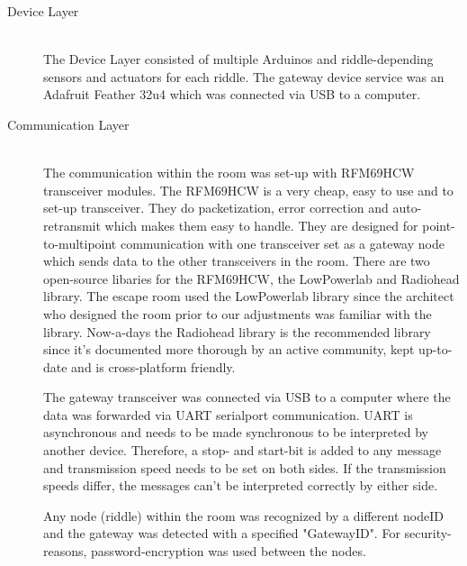 \begin{description}
	\item[Device Layer]\hfill \\
	      The Device Layer consisted of multiple Arduinos and riddle-depending sensors and actuators for each riddle.
	      The gateway device service was an Adafruit Feather 32u4 which was connected via USB to a computer.
	\item[Communication Layer]\hfill \\
	      The communication within the room was set-up with RFM69HCW transceiver modules.\parencite{radiorange}
          The RFM69HCW is a very cheap, easy to use and to set-up transceiver. They do packetization, error correction and auto-retransmit which makes them easy to handle.
	      They are designed for point-to-multipoint communication with one transceiver set as a gateway node which sends data to the other transceivers in the room.
	      There are two open-source libaries for the RFM69HCW, the LowPowerlab \parencite{LowPowerLab} and Radiohead \parencite{radiohead} library.
	      The escape room used the LowPowerlab library since the architect who designed the room prior to our adjustments was familiar with the library.
          Now-a-days the Radiohead library is the recommended library \parencite{adafruitRecommends} since it's documented more thorough by an active community, kept up-to-date and is cross-platform friendly.
         
          The gateway transceiver was connected via USB to a computer where the data was forwarded via UART serialport communication.
        UART is asynchronous and needs to be made synchronous to be interpreted by another device. 
          Therefore, a stop- and start-bit is added to any message and transmission speed needs to be set on both sides.
          If the transmission speeds differ, the messages can't be interpreted correctly by either side.
            
          Any node (riddle) within the room was recognized by a different nodeID and the gateway was detected with a specified "GatewayID". 
            For security-reasons, password-encryption was used between the nodes. 


\end{description}
